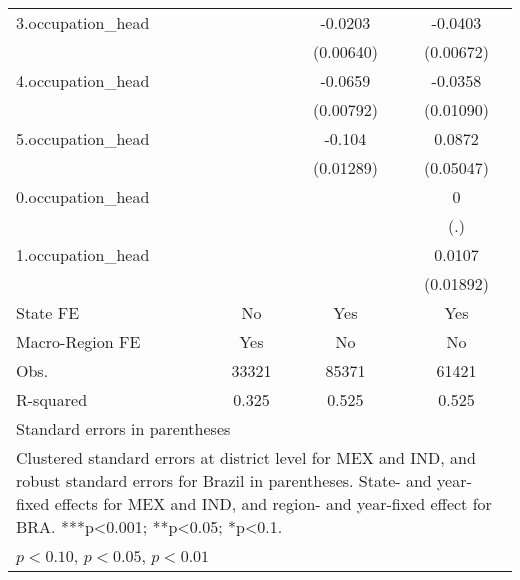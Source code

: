 \begin{table}[htbp]
{\begin{tabular}{l*{3}{c}}
3.occupation_head&                     &     -0.0203\sym{***}&     -0.0403\sym{***}\\
            &                     &   (0.00640)         &   (0.00672)         \\
4.occupation_head&                     &     -0.0659\sym{***}&     -0.0358\sym{***}\\
            &                     &   (0.00792)         &   (0.01090)         \\
5.occupation_head&                     &      -0.104\sym{***}&      0.0872\sym{*}  \\
            &                     &   (0.01289)         &   (0.05047)         \\
0.occupation_head&                     &                     &           0         \\
            &                     &                     &         (.)         \\
1.occupation_head&                     &                     &      0.0107         \\
            &                     &                     &   (0.01892)         \\
State FE    &          No         &         Yes         &         Yes         \\
Macro-Region FE &         Yes         &          No         &          No         \\
\hline
Obs.        &       33321         &       85371         &       61421         \\
R-squared   &       0.325         &       0.525         &       0.525         \\
\hline\hline
\multicolumn{4}{l}{\footnotesize Standard errors in parentheses}\\
\multicolumn{4}{l}{\footnotesize Clustered standard errors at district level for MEX and IND, and robust standard errors for Brazil in parentheses. State- and year-fixed effects for MEX and IND, and region- and year-fixed effect for BRA. ***p<0.001; **p<0.05; *p<0.1.}\\
\multicolumn{4}{l}{\footnotesize \sym{*} \(p<0.10\), \sym{**} \(p<0.05\), \sym{***} \(p<0.01\)}\\
\end{tabular}}
\end{table}
